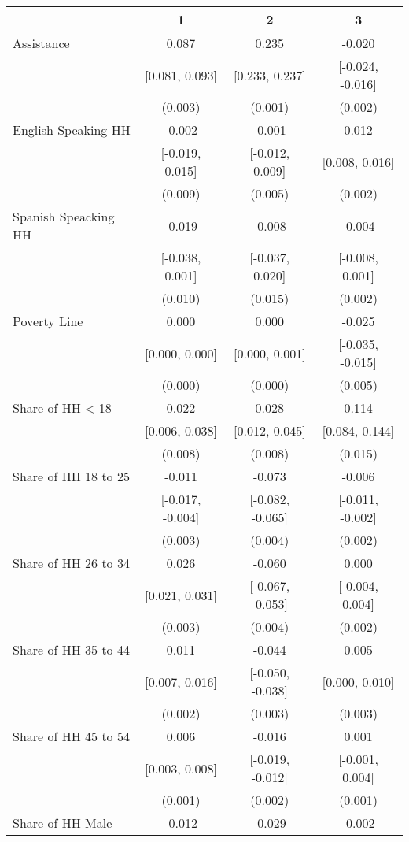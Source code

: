 \begin{table}[H]
\centering\begin{table}[H]
\centering
\begin{tabular}[t]{lccc}
\toprule
  & 1 & 2 & 3\\
\midrule
Assistance & 0.087 & 0.235 & -0.020\\
 & [0.081, 0.093] & [0.233, 0.237] & [-0.024, -0.016]\\
 & (0.003) & (0.001) & (0.002)\\
English Speaking HH & -0.002 & -0.001 & 0.012\\
 & [-0.019, 0.015] & [-0.012, 0.009] & [0.008, 0.016]\\
 & (0.009) & (0.005) & (0.002)\\
Spanish Speacking HH & -0.019 & -0.008 & -0.004\\
 & [-0.038, 0.001] & [-0.037, 0.020] & [-0.008, 0.001]\\
 & (0.010) & (0.015) & (0.002)\\
Poverty Line & 0.000 & 0.000 & -0.025\\
 & [0.000, 0.000] & [0.000, 0.001] & [-0.035, -0.015]\\
 & (0.000) & (0.000) & (0.005)\\
Share of HH < 18 & 0.022 & 0.028 & 0.114\\
 & [0.006, 0.038] & [0.012, 0.045] & [0.084, 0.144]\\
 & (0.008) & (0.008) & (0.015)\\
Share of HH 18 to 25 & -0.011 & -0.073 & -0.006\\
 & [-0.017, -0.004] & [-0.082, -0.065] & [-0.011, -0.002]\\
 & (0.003) & (0.004) & \vphantom{1} (0.002)\\
Share of HH 26 to 34 & 0.026 & -0.060 & 0.000\\
 & [0.021, 0.031] & [-0.067, -0.053] & [-0.004, 0.004]\\
 & (0.003) & (0.004) & (0.002)\\
Share of HH 35 to 44 & 0.011 & -0.044 & 0.005\\
 & [0.007, 0.016] & [-0.050, -0.038] & [0.000, 0.010]\\
 & (0.002) & (0.003) & (0.003)\\
Share of HH 45 to 54 & 0.006 & -0.016 & 0.001\\
 & [0.003, 0.008] & [-0.019, -0.012] & [-0.001, 0.004]\\
 & (0.001) & (0.002) & (0.001)\\
Share of HH Male & -0.012 & -0.029 & -0.002\\

\end{tabular}
\end{table}
\end{table}
